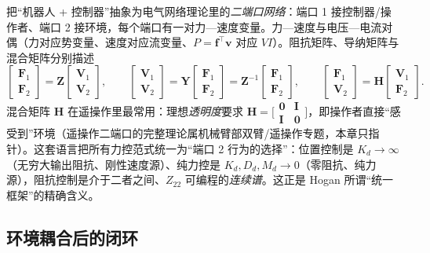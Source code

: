把“机器人 + 控制器”抽象为电气网络理论里的\emph{二端口网络}：端口 1 接控制器/操作者、端口 2 接环境，每个端口有一对力—速度变量。力—速度与电压—电流对偶（力对应势变量、速度对应流变量、$P=\mathbf f^\top\mathbf v$ 对应 $VI$）。阻抗矩阵、导纳矩阵与混合矩阵分别描述
\begin{equation}
  \begin{bmatrix}\mathbf F_1\\\mathbf F_2\end{bmatrix}=\mathbf Z\begin{bmatrix}\mathbf V_1\\\mathbf V_2\end{bmatrix},\qquad
  \begin{bmatrix}\mathbf V_1\\\mathbf V_2\end{bmatrix}=\mathbf Y\begin{bmatrix}\mathbf F_1\\\mathbf F_2\end{bmatrix}=\mathbf Z^{-1}\begin{bmatrix}\mathbf F_1\\\mathbf F_2\end{bmatrix},\qquad
  \begin{bmatrix}\mathbf F_1\\\mathbf V_2\end{bmatrix}=\mathbf H\begin{bmatrix}\mathbf V_1\\\mathbf F_2\end{bmatrix}.
  \label{eq:os-twoport}
\end{equation}
混合矩阵 $\mathbf H$ 在遥操作里最常用：理想\emph{透明度}要求 $\mathbf H=\bigl[\begin{smallmatrix}\mathbf 0&\mathbf I\\\mathbf I&\mathbf 0\end{smallmatrix}\bigr]$，即操作者直接“感受到”环境（遥操作二端口的完整理论属机械臂部双臂/遥操作专题，本章只指针）。这套语言把所有力控范式统一为“端口 2 行为的选择”：位置控制是 $K_d\to\infty$（无穷大输出阻抗、刚性速度源）、纯力控是 $K_d,D_d,M_d\to0$（零阻抗、纯力源），阻抗控制是介于二者之间、$Z_{22}$ 可编程的\emph{连续谱}。这正是 Hogan 所谓“统一框架”的精确含义。

\subsection{环境耦合后的闭环}
\label{sec:os-coupled}

